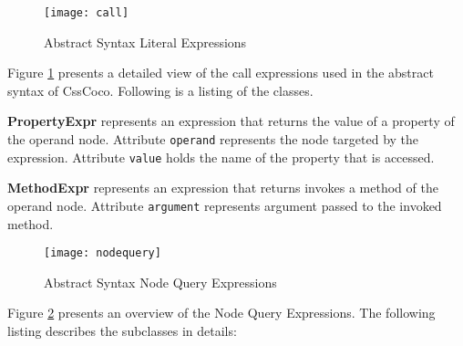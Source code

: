 \documentclass[parskip=full]{uvamscse}
\begin{document}
\begin{figure}[h!]
  \centering
  \caption{Abstract Syntax Literal Expressions}
  \label{fig:call}
  \texttt{[image: call]}
\end{figure}

Figure \ref{fig:call} presents a detailed view of the call expressions used in the abstract syntax of CssCoco. Following is a listing of the classes. 

\begin{description}

\item\textbf{PropertyExpr} represents an expression that returns the value of a property of the operand node. Attribute \texttt{operand} represents the node targeted by the expression. Attribute \texttt{value} holds the name of the property that is accessed.

\item\textbf{MethodExpr} represents an expression that returns invokes a method of the operand node. Attribute \texttt{argument} represents argument passed to the invoked method.

\end{description}

\begin{figure}[h!]
  \centering
  \caption{Abstract Syntax Node Query Expressions}
  \label{fig:nodequery}
  \texttt{[image: nodequery]}
\end{figure}

Figure \ref{fig:nodequery} presents an overview of the Node Query Expressions. The following listing describes the subclasses in details:
\end{document}
